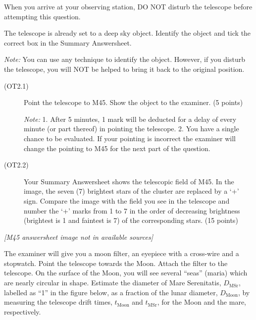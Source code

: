 
When you arrive at your observing station, DO NOT disturb the telescope
before attempting this question.

The telescope is already set to a deep sky object. Identify the object and
tick the correct box in the Summary Answersheet.

\emph{Note:} You can use any technique to identify the object. However, if
you disturb the telescope, you will NOT be helped to bring it back to the
original position.

\begin{description}
\item[(OT2.1)] Point the telescope to M45. Show the object to the
  examiner. \hfill(5 points)

  \emph{Note:} 1. After 5 minutes, 1 mark will be deducted for a delay of
  every minute (or part thereof) in pointing the telescope.
  2. You have a single chance to be evaluated. If your pointing is incorrect
  the examiner will change the pointing to M45 for the next part of the
  question.
\item[(OT2.2)] Your Summary Answersheet shows the telescopic field of M45.
  In the image, the seven (7) brightest stars of the cluster are replaced by
  a `+' sign. Compare the image with the field you see in the telescope and
  number the `+' marks from 1 to 7 in the order of decreasing brightness
  (brightest is 1 and faintest is 7) of the corresponding stars. \hfill(15 points)
\end{description}

\textit{[M45 answersheet image not in available sources]}

The examiner will give you a moon filter, an eyepiece with a cross-wire and
a stopwatch. Point the telescope towards the Moon. Attach the filter to the
telescope. On the surface of the Moon, you will see several ``seas'' (maria)
which are nearly circular in shape. Estimate the diameter of Mare
Serenitatis, $D_{\mathrm{MSr}}$, labelled as ``1'' in the figure below, as a
fraction of the lunar diameter, $D_{\mathrm{Moon}}$, by measuring the
telescope drift times, $t_{\mathrm{Moon}}$ and $t_{\mathrm{MSr}}$, for the
Moon and the mare, respectively.


